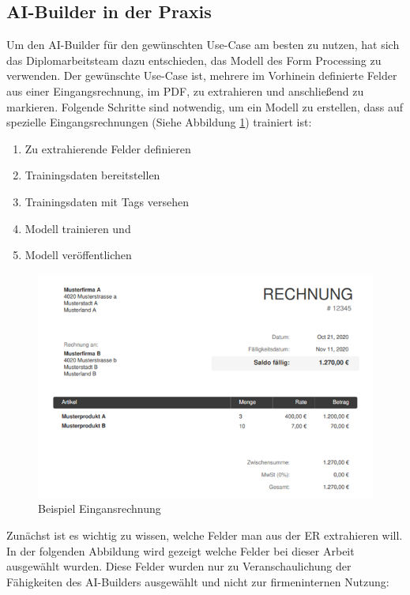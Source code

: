 \subsection{AI-Builder in der Praxis}

Um den AI-Builder für den gewünschten Use-Case am besten zu nutzen, hat sich das Diplomarbeitsteam dazu entschieden, das Modell des Form Processing zu verwenden. Der gewünschte Use-Case ist, mehrere im Vorhinein definierte Felder aus einer Eingangsrechnung, im PDF, zu extrahieren und anschließend zu markieren. Folgende Schritte sind notwendig, um ein Modell zu erstellen, dass auf spezielle Eingangsrechnungen (Siehe Abbildung \ref{fig:example-invoice-figure}) trainiert ist:

\begin{enumerate}
    \item Zu extrahierende Felder definieren
    \item Trainingsdaten bereitstellen
    \item Trainingsdaten mit Tags versehen
    \item Modell trainieren und
    \item Modell veröffentlichen
\end{enumerate}

\begin{figure}[h]
    \centering
    \includegraphics[scale=0.9]{sections/cloud-computing/images/example-invoice.png}
    \caption{Beispiel Eingansrechnung}
    \label{fig:example-invoice-figure}
\end{figure}

Zunächst ist es wichtig zu wissen, welche Felder man aus der ER extrahieren will. In der folgenden Abbildung wird gezeigt welche Felder bei dieser Arbeit ausgewählt wurden. Diese Felder wurden nur zu Veranschaulichung der Fähigkeiten des AI-Builders ausgewählt und nicht zur firmeninternen Nutzung:

